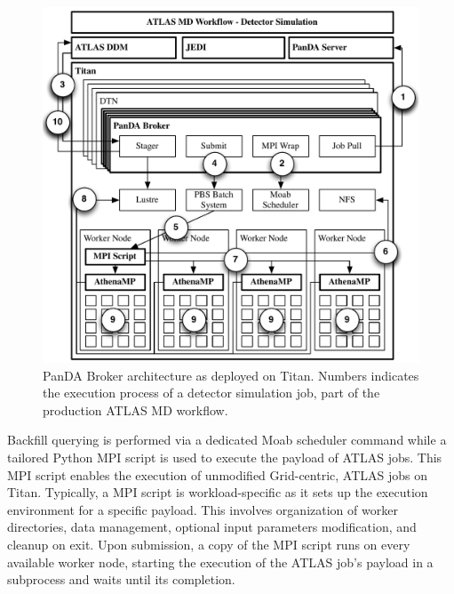 
\begin{figure}
    \centering
    \includegraphics[width=\columnwidth]{figures/panda_broker_architecture.pdf}
    \caption{PanDA Broker architecture as deployed on Titan. Numbers indicates
    the execution process of a detector simulation job, part of the production
    ATLAS MD workflow.}
\label{fig:panda_broker}
\end{figure}

Backfill querying is performed via a dedicated Moab scheduler command while a
tailored Python MPI script is used to execute the payload of ATLAS jobs. This
MPI script enables the execution of unmodified Grid-centric, ATLAS jobs on
Titan. Typically, a MPI script is workload-specific as it sets up the execution
environment for a specific payload. This involves organization of worker
directories, data management, optional input parameters modification, and
cleanup on exit. Upon submission, a copy of the MPI script runs on every
available worker node,
starting the execution of the ATLAS job's payload in a subprocess and waits
until its completion.

